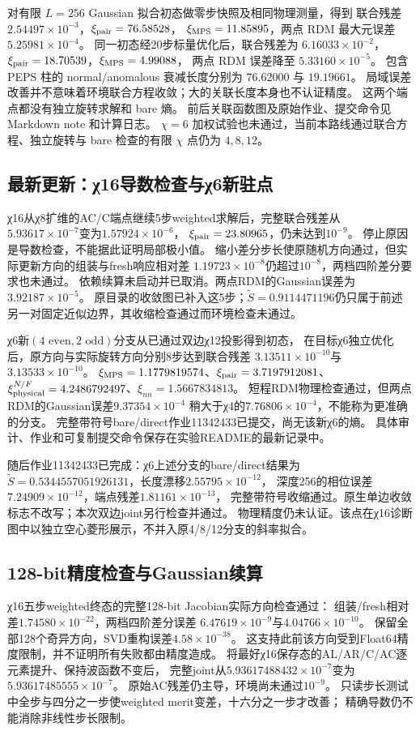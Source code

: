 对有限 $L=256$ Gaussian 拟合初态做零步快照及相同物理测量，得到
联合残差 $2.54497\times10^{-3}$，$\xi_{\rm pair}=76.58528$，
$\xi_{\rm MPS}=11.85895$，两点 RDM 最大元误差 $5.25981\times10^{-4}$。
同一初态经20步标量优化后，联合残差为 $6.16033\times10^{-2}$，
$\xi_{\rm pair}=18.70539$，$\xi_{\rm MPS}=4.99088$，
两点 RDM 误差降至 $5.33160\times10^{-5}$。
包含 PEPS 柱的 normal/anomalous 衰减长度分别为 $76.62000$ 与 $19.19661$。
局域误差改善并不意味着环境联合方程收敛；大的关联长度本身也不认证精度。
这两个端点都没有独立旋转求解和 bare 熵。
前后关联函数图及原始作业、提交命令见 Markdown note 和计算日志。
$\chi=6$ 加权试验也未通过，当前本路线通过联合方程、独立旋转与
bare 检查的有限 $\chi$ 点仍为 $4,8,12$。


\subsection{最新更新：χ16导数检查与χ6新驻点}
χ16从χ8扩维的AC/C端点继续5步weighted求解后，完整联合残差从
$5.93617\times10^{-7}$变为$1.57924\times10^{-6}$，
$\xi_{\rm pair}=23.80965$，仍未达到$10^{-9}$。
停止原因是导数检查，不能据此证明局部极小值。
缩小差分步长使原随机方向通过，但实际更新方向的组装与fresh响应相对差
$1.19723\times10^{-8}$仍超过$10^{-8}$，两档四阶差分要求也未通过。
依赖续算未启动并已取消。两点RDM的Gaussian误差为$3.92187\times10^{-5}$。
原目录的收敛图已补入这5步；$\widetilde S=0.9114471196$仍只属于前述
另一对固定近似边界，其收缩检查通过而环境检查未通过。

χ6新$(4\text{ even},2\text{ odd})$分支从已通过双边χ12投影得到初态，
在目标χ6独立优化后，原方向与实际旋转方向分别8步达到联合残差
$3.13511\times10^{-10}$与$3.13533\times10^{-10}$。
$\xi_{\rm MPS}=1.1779819574$、$\xi_{\rm pair}=3.7197912081$、
$\xi_{\rm physical}^{N/F}=4.2486792497$、$\xi_{nn}=1.5667834813$。
短程RDM物理检查通过，但两点RDM的Gaussian误差$9.37354\times10^{-4}$
稍大于χ4的$7.76806\times10^{-4}$，不能称为更准确的分支。
完整带符号bare/direct作业11342433已提交，尚无该新χ6的熵。
具体审计、作业和可复制提交命令保存在实验README的最新记录中。


随后作业11342433已完成：χ6上述分支的bare/direct结果为
$\widetilde S=0.5344557051926131$，长度漂移$2.55795\times10^{-12}$，
深度256的相位误差$7.24909\times10^{-12}$，端点残差$1.81161\times10^{-13}$，
完整带符号收缩通过。原生单边收敛标志不改写；本次双边joint另行检查并通过。
物理精度仍未认证。该点在χ16诊断图中以独立空心菱形展示，不并入原4/8/12分支的斜率拟合。


\subsection{128-bit精度检查与Gaussian续算}
χ16五步weighted终态的完整128-bit Jacobian实际方向检查通过：
组装/fresh相对差$1.74580\times10^{-22}$，两档四阶差分误差
$6.47619\times10^{-9}$与$4.04766\times10^{-10}$。
保留全部128个奇异方向，SVD重构误差$4.58\times10^{-38}$。
这支持此前该方向受到Float64精度限制，并不证明所有失败都由精度造成。
将最好χ16保存态的AL/AR/C/AC逐元素提升、保持波函数不变后，
完整joint从$5.93617488432\times10^{-7}$变为$5.93617485555\times10^{-7}$。
原始AC残差仍主导，环境尚未通过$10^{-9}$。
只读步长测试中全步与四分之一步使weighted merit变差，十六分之一步才改善；
精确导数仍不能消除非线性步长限制。

